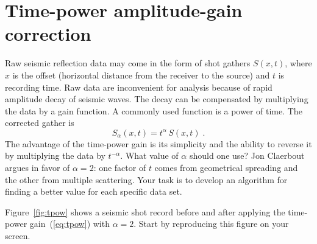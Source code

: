 \newpage

\lstset{language=python,numbers=left,numberstyle=\tiny,showstringspaces=false}


\section{Time-power amplitude-gain correction}

Raw seismic reflection data may come in the form of shot gathers
$S(x,t)$, where $x$ is the offset (horizontal distance from the
receiver to the source) and $t$ is recording time. Raw data are
inconvenient for analysis because of rapid amplitude decay of seismic
waves. The decay can be compensated by multiplying the data by a gain
function. A commonly used function is a power of time. The corrected
gather is
\begin{equation}
\label{eq:tpow}
S_\alpha(x,t) = t^{\alpha}\,S(x,t)\;.
\end{equation}
The advantage of the time-power gain is its simplicity and the ability
to reverse it by multiplying the data by $t^{-\alpha}$. What value of
$\alpha$ should one use? Jon Claerbout argues in favor of $\alpha=2$:
one factor of $t$ comes from geometrical spreading and the other from
multiple scattering. Your task is to develop an algorithm for finding
a better value for each specific data set.


Figure~\ref{fig:tpow} shows a seismic shot record before and after
applying the time-power gain~(\ref{eq:tpow}) with $\alpha=2$. Start
by reproducing this figure on your screen.

